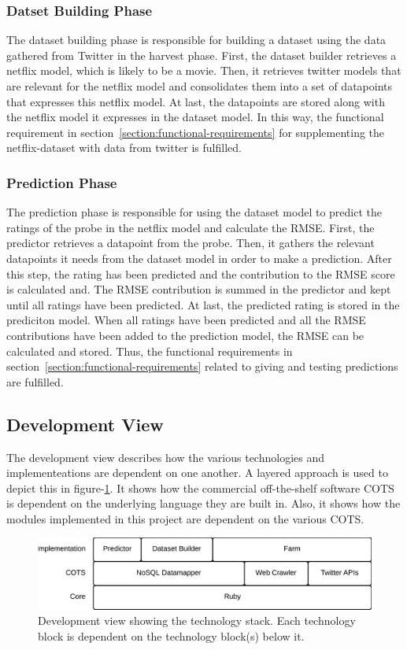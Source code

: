 \subsubsection{Datset Building Phase}
The dataset building phase is responsible for building a dataset using the data gathered from Twitter in the harvest phase. First, the dataset builder retrieves a netflix model, which is likely to be a movie. Then, it retrieves twitter models that are relevant for the netflix model and consolidates them into a set of datapoints that expresses this netflix model. At last, the datapoints are stored along with the netflix model it expresses in the dataset model. In this way, the functional requirement in section~\ref{section:functional-requirements} for supplementing the netflix-dataset with data from twitter is fulfilled.

\subsubsection{Prediction Phase}
The prediction phase is responsible for using the dataset model to predict the ratings of the probe in the netflix model and calculate the RMSE. First, the predictor retrieves a datapoint from the probe. Then, it gathers the relevant datapoints it needs from the dataset model in order to make a prediction. After this step, the rating has been predicted and the contribution to the RMSE score is calculated and. The RMSE contribution is summed in the predictor and kept until all ratings have been predicted. At last, the predicted rating is stored in the prediciton model. When all ratings have been predicted and all the RMSE contributions have been added to the prediction model, the RMSE can be calculated and stored. Thus, the functional requirements in section~\ref{section:functional-requirements} related to giving and testing predictions are fulfilled.

\subsection{Development View}
The development view describes how the various technologies and implementeations are dependent on one another. A layered approach is used to depict this in figure-\ref{figure:development-view}. It shows how the commercial off-the-shelf software COTS is dependent on the underlying language they are built in. Also, it shows how the modules implemented in this project are dependent on the various COTS.

\begin{figure}[H]
\centerline{\includegraphics[width=4.5in]{image/architecture-development-view.png}}
\caption{Development view showing the technology stack. Each technology block is dependent on the technology block(s) below it.}
\label{figure:development-view}
\end{figure}

